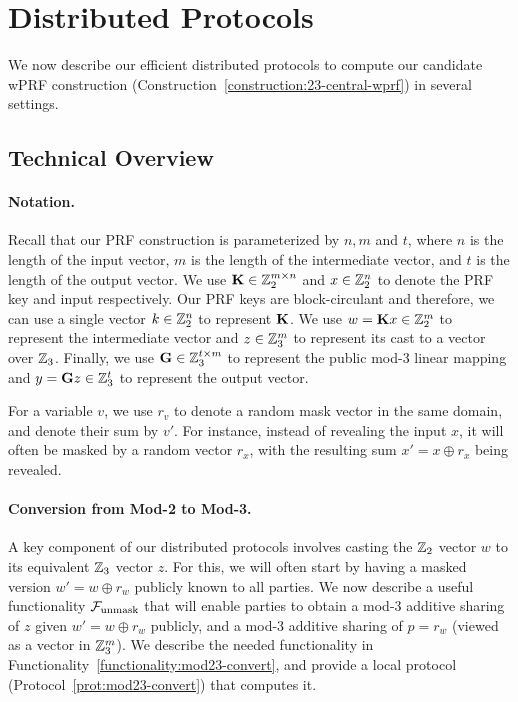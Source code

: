 \newpage
\section{Distributed Protocols}
\noindent {}

\noindent We now describe our efficient distributed protocols to compute our candidate wPRF construction (Construction~\ref{construction:23-central-wprf}) in several settings.


\subsection{Technical Overview}

\paragraph{Notation.}
Recall that our PRF construction is parameterized by $n, m$ and $t$, where $n$ is the length of the input vector, $m$ is the length of the intermediate vector, and $t$ is the length of the output vector. We use $\mat{K} \in \Z_2^{m \times n}$ and $x \in \mathbb{Z}_2^n$ to denote the PRF key and input respectively. Our PRF keys are block-circulant and therefore, we can use a single vector $k \in \mathbb{Z}_2^n$ to represent $\mat{K}$. We use $w = \mat{K}x \in \Z_2^{m}$ to represent the intermediate vector and $z \in \mathbb{Z}_3^m$ to represent its cast to a vector over $\mathbb{Z}_3$. Finally, we use $\mat{G} \in \Z_3^{t \times m}$ to represent the public mod-3 linear mapping and $y = \mat{G}z \in \Z_3^t$ to represent the output vector.

For a variable $v$, we use $r_v$ to denote a random mask vector in the same domain, and denote their sum by $v'$. For instance, instead of revealing the input $x$, it will often be masked by a random vector $r_x$, with the resulting sum $x' = x \oplus r_x$ being revealed.

\paragraph{Conversion from Mod-2 to Mod-3.}
A key component of our distributed protocols involves casting the $\mathbb{Z}_2$ vector $w$ to its equivalent $\mathbb{Z}_3$ vector $z$. For this, we will often start by having a masked version $w' = w \oplus r_w$ publicly known to all parties. We now describe a useful functionality $\mathcal{F}_{\textnormal{unmask}}$ that will enable parties to obtain a mod-3 additive sharing of $z$ given $w' = w \oplus r_w$ publicly, and a mod-3 additive sharing of $p = r_w$ (viewed as a vector in $\mathbb{Z}_3^m$). We describe the needed functionality in Functionality~\ref{functionality:mod23-convert}, and provide a local protocol (Protocol~\ref{prot:mod23-convert}) that computes it.


